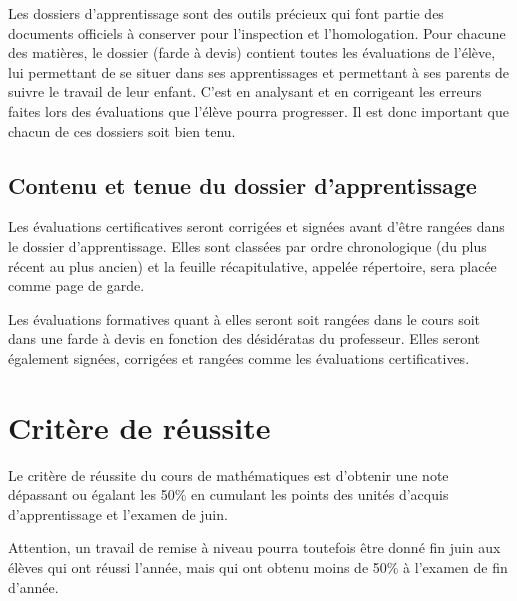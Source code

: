 \documentclass[parskip=half-, numbers=enddot, DIV=15]{scrartcl}
\begin{document}
Les dossiers d'apprentissage sont des outils précieux qui font partie
des documents officiels à conserver pour l'inspection et l'homologation.
Pour chacune des matières, le dossier (farde à devis) contient toutes
les évaluations de l'élève, lui permettant de se situer dans ses
apprentissages et permettant à ses parents de suivre le travail de leur
enfant. C'est en analysant et en corrigeant les erreurs faites lors des
évaluations que l'élève pourra progresser. Il est donc important que
chacun de ces dossiers soit bien tenu.

\subsection{Contenu et tenue du dossier d'apprentissage}

Les évaluations certificatives seront corrigées et signées avant d'être rangées dans le dossier d'apprentissage. 
Elles sont classées par ordre chronologique (du plus récent au plus ancien) et la feuille récapitulative, appelée répertoire, sera placée comme page de garde.

Les évaluations formatives quant à elles seront soit rangées dans le cours soit dans une farde à devis en fonction des désidératas du professeur. Elles seront également signées, corrigées et rangées comme les évaluations certificatives.

\section{Critère de réussite}

Le critère de réussite du cours de mathématiques est d'obtenir une note dépassant ou égalant les 50\% en cumulant les points des unités d'acquis d'apprentissage et l'examen de juin. 

Attention, un travail de remise à niveau pourra toutefois être donné fin juin aux élèves qui ont réussi l'année, mais qui ont obtenu moins de 50\% à l'examen de fin d'année.
\end{document}
